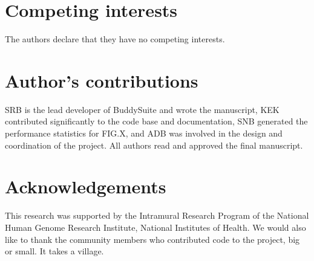 \documentclass[twocolumn]{bmcart}%
\begin{document}

\begin{backmatter}

\section*{Competing interests}
  The authors declare that they have no competing interests.

\section*{Author's contributions}
  SRB is the lead developer of BuddySuite and wrote the manuscript, KEK contributed significantly to the code base and documentation, SNB generated the performance statistics for FIG.X, and ADB was involved in the design and coordination of the project. All authors read and approved the final manuscript.

\section*{Acknowledgements}
  This research was supported by the Intramural Research Program of the National Human Genome Research Institute, National Institutes of Health. We would also like to thank the community members who contributed code to the project, big or small. It takes a village.




\end{backmatter}
\end{document}
